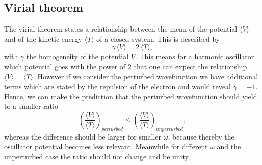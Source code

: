 \subsection{Virial theorem}
The virial theorem states a relationship between the mean of the potential $\langle V \rangle$ and of the kinetic energy $\langle T \rangle$ of a closed system. This is described by
\begin{equation}
    \gamma \, \langle V \rangle = 2\, \langle T \rangle,
\end{equation}
with $\gamma$ the homogeneity of the potential $V$. This means for a harmonic oscillator which potential goes with the power of $2$ that one can expect the relationship $\langle V \rangle = \langle T \rangle$. However if we consider the perturbed wavefunction we have additional terms which are stated by the repulsion of the electron and would reveal $\gamma = -1$. Hence, we can make the prediction that the perturbed wavefunction should yield to a smaller ratio 
\begin{equation}
\left(\frac{\langle V \rangle}{\langle T \rangle}\right)_{perturbed} \leq \left(\frac{\langle V \rangle}{\langle T \rangle}\right)_{unperturbed},
\end{equation}
whereas the difference should be larger for smaller $\omega$, because thereby the oscillator potential becomes less relevant. Meanwhile for different $\omega$ and the unperturbed case the ratio should not change and be unity.

